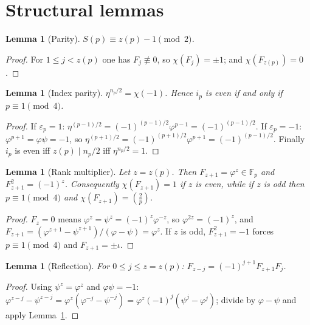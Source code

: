 \documentclass[11pt]{amsart}
\theoremstyle{plain}
\newtheorem{lemma}[theorem]{Lemma}
\theoremstyle{definition}
\newcommand{\Fp}{\mathbb{F}_p}
\newcommand{\leg}[2]{\left(\frac{#1}{#2}\right)}
\begin{document}
\section{Structural lemmas}\label{sec:struct}

\begin{lemma}[Parity]\label{lem:parity}
$S(p)\equiv z(p)-1\pmod 2$.
\end{lemma}
\begin{proof}
For $1\le j<z(p)$ one has $F_j\not\equiv0$, so $\chi(F_j)=\pm1$; and $\chi(F_{z(p)})=0$.
\end{proof}

\begin{lemma}[Index parity]\label{lem:index-parity}
$\eta^{n_p/2}=\chi(-1)$. Hence $i_p$ is even if and only if $p\equiv1\pmod4$.
\end{lemma}
\begin{proof}
If $\varepsilon_p=1$: $\eta^{(p-1)/2}=(-1)^{(p-1)/2}\varphi^{p-1}=(-1)^{(p-1)/2}$.
If $\varepsilon_p=-1$: $\varphi^{p+1}=\varphi\psi=-1$, so
$\eta^{(p+1)/2}=(-1)^{(p+1)/2}\varphi^{p+1}=(-1)^{(p-1)/2}$. Finally $i_p$ is even
iff $z(p)\mid n_p/2$ iff $\eta^{n_p/2}=1$.
\end{proof}

\begin{lemma}[Rank multiplier]\label{lem:multiplier}
Let $z=z(p)$. Then $F_{z+1}=\varphi^{z}\in\Fp$ and $F_{z+1}^2=(-1)^z$. Consequently
$\chi(F_{z+1})=1$ if $z$ is even, while if $z$ is odd then $p\equiv1\pmod4$ and
$\chi(F_{z+1})=\leg2p$.
\end{lemma}
\begin{proof}
$F_z=0$ means $\varphi^z=\psi^z=(-1)^z\varphi^{-z}$, so $\varphi^{2z}=(-1)^z$, and
$F_{z+1}=(\varphi^{z+1}-\psi^{z+1})/(\varphi-\psi)=\varphi^z$. If $z$ is odd,
$F_{z+1}^2=-1$ forces $p\equiv1\pmod4$ and $F_{z+1}=\pm\iota$.
\end{proof}

\begin{lemma}[Reflection]\label{lem:reflection}
For $0\le j\le z=z(p)$: $F_{z-j}=(-1)^{j+1}F_{z+1}F_j$.
\end{lemma}
\begin{proof}
Using $\psi^z=\varphi^z$ and $\varphi\psi=-1$:
$\varphi^{z-j}-\psi^{z-j}=\varphi^z(\varphi^{-j}-\psi^{-j})
=\varphi^z(-1)^{j}(\psi^{j}-\varphi^{j})$; divide by $\varphi-\psi$ and apply
Lemma~\ref{lem:multiplier}.
\end{proof}
\end{document}
